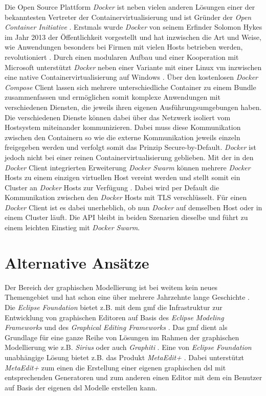 Die Open Source Plattform \textit{Docker} ist neben vielen anderen Lösungen einer der bekanntesten Vertreter der Containervirtualisierung und ist Gründer der \textit{Open Container Initiative} \cite{about_docker}. Erstmals wurde \textit{Docker} von seinem Erfinder Solomon Hykes im Jahr 2013 der Öffentlichkeit vorgestellt und hat inzwischen die Art und Weise, wie Anwendungen besonders bei Firmen mit vielen Hosts betrieben werden, revolutioniert \cite{docker_adoption}. Durch einen modularen Aufbau und einer Kooperation mit Microsoft unterstützt \textit{Docker} neben einer Variante mit einer Linux \ac{vm} inzwischen eine native Containervirtualisierung auf Windows \cite{docker_for_windows}. Über den kostenlosen \textit{Docker Compose} Client lassen sich mehrere unterschiedliche Container zu einem Bundle zusammenfassen \cite{docker_compose} und ermöglichen somit komplexe Anwendungen mit verschiedenen Diensten, die jeweils ihren eigenen Ausführungsumgebungen haben. Die verschiedenen Dienste können dabei über das Netzwerk isoliert vom Hostsystem miteinander kommunizieren. Dabei muss diese Kommunikation zwischen den Containern so wie die externe Kommunikation jeweils einzeln freigegeben werden und verfolgt somit das Prinzip Secure-by-Default. \textit{Docker} ist jedoch nicht bei einer reinen Containervirtualisierung geblieben. Mit der in den \textit{Docker} Client integrierten Erweiterung \textit{Docker Swarm} können mehrere \textit{Docker} Hosts zu einem einzigen virtuellen Host vereint werden und stellt somit ein Cluster an \textit{Docker} Hosts zur Verfügung \cite{docker_swarm}. Dabei wird per Default die Kommunikation zwischen den \textit{Docker} Hosts mit TLS verschlüsselt. Für einen \textit{Docker} Client ist es dabei unerheblich, ob nun \textit{Docker} auf demselben Host oder in einem Cluster läuft. Die API bleibt in beiden Szenarien dieselbe und führt zu einem leichten Einstieg mit \textit{Docker Swarm}.

\section{Alternative Ansätze}

Der Bereich der graphischen Modellierung ist bei weitem kein neues Themengebiet und hat schon eine über mehrere Jahrzehnte lange Geschichte \cite{paper_metaedit}. Die \textit{Eclipse Foundation} bietet z.B. mit dem \ac{gmf} die Infrastruktur zur Entwicklung von graphischen Editoren auf Basis des \textit{Eclipse Modeling Frameworks} und des \textit{Graphical Editing Frameworks} \cite{eclipse_gmf}. Das \ac{gmf} dient als Grundlage für eine ganze Reihe von Lösungen im Rahmen der graphischen Modellierung wie z.B. \textit{Sirius} oder auch \textit{Graphiti} \cite{sirius,graphiti}. Eine von \textit{Eclipse Foundation} unabhängige Lösung bietet z.B. das Produkt \textit{MetaEdit+} \cite{metaedit}. Dabei unterstützt \textit{MetaEdit+} zum einen die Erstellung einer eigenen graphischen \ac{dsl} mit entsprechenden Generatoren und zum anderen einen Editor mit dem ein Benutzer auf Basis der eigenen \ac{dsl} Modelle erstellen kann. 

